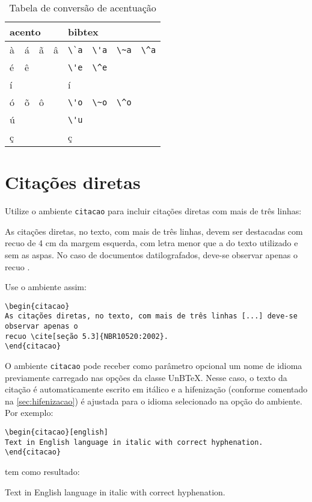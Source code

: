 \begin{table}[htb]
\centering
\caption{Tabela de conversão de acentuação}
\label{tab:acentos}
\begin{tabular}{llllllll} \toprule
\multicolumn{4}{l}{acento} & \multicolumn{4}{l}{bibtex} \\ \midrule
\`a & \'a & \~a & \^a & \verb|\`a| & \verb|\'a| & \verb|\~a| & \verb|\^a| \\
\'e & \^e & & & \verb|\'e| & \verb|\^e| & & \\
í & & & & \multicolumn{2}{l}{\Verb{{\'i}}} & & \\
\'o & \~o & \^o & & \verb|\'o| & \verb|\~o| & \verb|\^o| & \\
\'u & & & & \verb|\'u| & & & \\
{\c c} & & & & \multicolumn{2}{l}{\Verb{{\c c}}} & & \\ \bottomrule
\end{tabular}
\end{table}

\section{Citações diretas}\label{sec:citacao}

Utilize o ambiente \texttt{citacao} para incluir citações diretas com mais de três linhas:
\begin{citacao}
As citações diretas, no texto, com mais de três linhas, devem ser destacadas com recuo de 4 cm da margem esquerda, com letra menor que a do texto utilizado e sem as aspas. No caso de documentos datilografados, deve-se observar apenas o recuo \cite[seção 5.3]{NBR10520:2002}.
\end{citacao}

Use o ambiente assim:
\begin{verbatim}
\begin{citacao}
As citações diretas, no texto, com mais de três linhas [...] deve-se observar apenas o
recuo \cite[seção 5.3]{NBR10520:2002}.
\end{citacao}
\end{verbatim}

O ambiente \texttt{citacao} pode receber como parâmetro opcional um nome de idioma previamente carregado nas opções da classe UnB\TeX. Nesse caso, o texto da citação é automaticamente escrito em itálico e a hifenização (conforme comentado na \cref{sec:hifenizacao}) é ajustada para o idioma selecionado na opção do ambiente. Por exemplo:
\begin{verbatim}
\begin{citacao}[english]
Text in English language in italic with correct hyphenation.
\end{citacao}
\end{verbatim}
tem como resultado:
\begin{citacao}[english]
Text in English language in italic with correct hyphenation.
\end{citacao}

